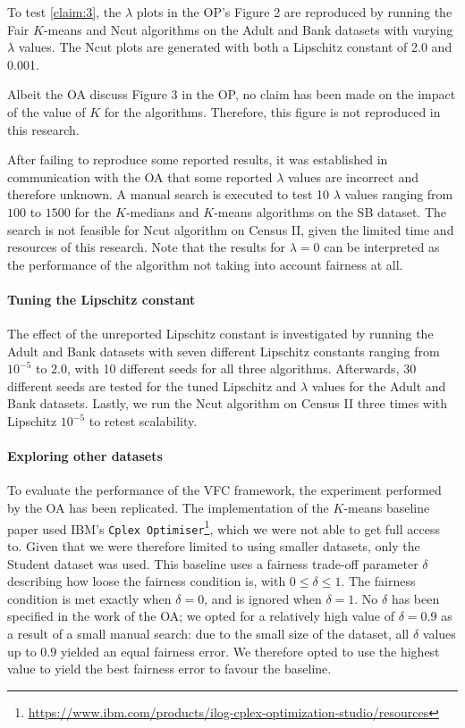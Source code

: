 To test \ref{claim:3}, the $\lambda$ plots in the OP's Figure 2 are reproduced by running the Fair $K$-means and Ncut algorithms on the Adult and Bank datasets with varying $\lambda$ values. The Ncut plots are generated with both a Lipschitz constant of 2.0 and 0.001.

Albeit the OA discuss Figure 3 in the OP, no claim has been made on the impact of the value of $K$ for the algorithms. Therefore, this figure is not reproduced in this research.

After failing to reproduce some reported results, it was established in communication with the OA that some reported $\lambda$ values are incorrect and therefore unknown. A manual search is executed to test 10 $\lambda$ values ranging from $100$ to $1500$ for the $K$-medians and $K$-means algorithms on the SB dataset. The search is not feasible for Ncut algorithm on Census II, given the limited time and resources of this research. Note that the results for $\lambda = 0$ can be interpreted as the performance of the algorithm not taking into account fairness at all. 

\paragraph{Tuning the Lipschitz constant}
The effect of the unreported Lipschitz constant is investigated by running the Adult and Bank datasets with seven different Lipschitz constants ranging from $10^{-5}$ to $2.0$, with 10 different seeds for all three algorithms. Afterwards, 30 different seeds are tested for the tuned Lipschitz and $\lambda$ values for the Adult and Bank datasets. Lastly,  we run the Ncut algorithm on Census II three times with Lipschitz $10^{-5}$ to retest scalability.

\paragraph{Exploring other datasets} To evaluate the performance of the VFC framework, the experiment performed by the OA has been replicated. The implementation of the $K$-means baseline paper \cite{bera2019fair} used IBM's \texttt{Cplex Optimiser}\footnote{\url{https://www.ibm.com/products/ilog-cplex-optimization-studio/resources}}, which we were not able to get full access to. Given that we were therefore limited to using smaller datasets, only the Student dataset was used. This baseline uses a fairness trade-off parameter $\delta$ describing how loose the fairness condition is, with $0 \leq \delta \leq 1$. The fairness condition is met exactly when $\delta = 0$, and is ignored when $\delta = 1$. No $\delta$ has been specified in the work of the OA; we opted for a relatively high value of $\delta = 0.9$ as a result of a small manual search: due to the small size of the dataset, all $\delta$ values up to $0.9$ yielded an equal fairness error. We therefore opted to use the highest value to yield the best fairness error to favour the baseline. 

